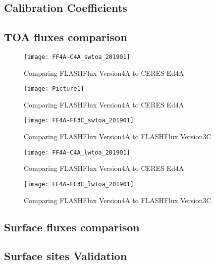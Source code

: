 \documentclass[12pt]{article}
\begin{document}
\subsection{Calibration Coefficients}
\subsection{TOA fluxes comparison}
\begin{figure}[h]
\caption{Comparing FLASHFlux Version4A to CERES Ed4A}
\texttt{[image: FF4A-C4A\_swtoa\_201901]}
\centering
\end{figure}

\begin{figure}[h]
\caption{Comparing FLASHFlux Version4A to CERES Ed4A}
\texttt{[image: Picture1]}
\centering
\end{figure}

\begin{figure}[h]
\caption{Comparing FLASHFlux Version4A to FLASHFlux Version3C}
\texttt{[image: FF4A-FF3C\_swtoa\_201901]}
\centering
\end{figure}

\begin{figure}[h]
\caption{Comparing FLASHFlux Version4A to CERES Ed4A}
\texttt{[image: FF4A-C4A\_lwtoa\_201901]}
\centering
\end{figure}

\begin{figure}[h]
\caption{Comparing FLASHFlux Version4A to FLASHFlux Version3C}
\texttt{[image: FF4A-FF3C\_lwtoa\_201901]}
\centering
\end{figure}

\subsection{Surface fluxes comparison}

\subsection{Surface sites Validation}



\end{document}
